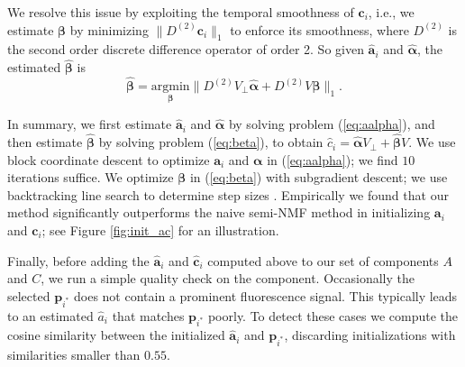 \documentclass[10pt,letterpaper]{article}
\begin{document}
{%



We resolve this issue by exploiting the temporal smoothness of $\bm{c}_i$, i.e., we estimate $\bm{\beta}$ by minimizing $\|D^{(2)}\bm{c}_i\|_1$ to enforce its smoothness, where $D^{(2)}$ is the second order discrete difference operator of order 2. So given $\hat{\bm{a}}_i$ and $\hat{\bm{\alpha}}$, the estimated $\hat{\bm{\beta}}$ is
\begin{equation}
	\hat{\bm{\beta}} = \underset{\bm\beta}{\text{argmin}}\|D^{(2)}V_\perp\hat{\bm\alpha} + D^{(2)}V{\bm\beta }\|_1. 
    \label{eq:beta}
\end{equation}

In summary, we first estimate $\hat{\bm{a}}_i$ and $\hat{\bm{\alpha}}$ by solving problem (\ref{eq:aalpha}),
and then estimate $\hat{\bm{\beta}}$ by solving problem (\ref{eq:beta}), to obtain $\hat{c}_i = \hat{\bm{\alpha}}V_\perp + \hat{\bm{\beta}}V$.  
We use block coordinate descent \citep{Cichocki2007} to optimize $\bm{a}_i$ and $\bm{\alpha}$ in (\ref{eq:aalpha}); we find $10$ iterations suffice. We optimize $\bm{\beta}$ in (\ref{eq:beta}) with subgradient descent; we use backtracking line search to determine step sizes \citep{Boyd2004}. Empirically we found that our method significantly outperforms the naive semi-NMF method in initializing $\bm{a}_i$  and $\bm{c}_i$; see Figure \ref{fig:init_ac} for an illustration. 





Finally, before adding the $\hat{\bm{a}}_i$ and $\hat{\bm{c}}_i$ computed above to our set of components $A$ and $C$, we run a simple quality check on the component.  Occasionally the selected $\bm{p}_{i^*}$ does not contain a prominent fluorescence signal.  This typically leads to an estimated $\hat{a}_i$ that matches $\bm{p}_{i^*}$ poorly.  To detect these cases we compute the cosine similarity between the initialized $\hat{\bm a}_i$ and $\bm{p}_{i^*}$, discarding initializations with similarities smaller than $0.55$. 

}
\end{document}
